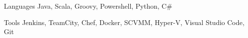 

\begin{cvskills}

  \cvskill
    {Languages} %
    {Java, Scala, Groovy, Powershell, Python, C\#} %
  
  \cvskill
    {Tools} %
    {Jenkins, TeamCity, Chef, Docker, SCVMM, Hyper-V, Visual Studio Code, Git} %

\end{cvskills}
